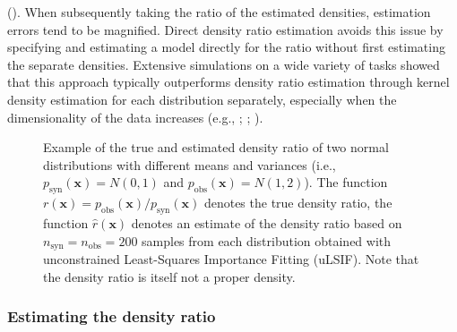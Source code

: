 \documentclass[
]{article}
\newcommand{\pobs}{p_{\text{obs}}}
\newcommand{\psyn}{p_{\text{syn}}}
\newcommand{\nobs}{n_{\text{obs}}}
\newcommand{\nsyn}{n_{\text{syn}}}
\newcommand{\bx}{\mathbf{x}}
\begin{document}
(). When subsequently taking the ratio of the estimated
densities, estimation errors tend to be magnified. Direct density ratio
estimation avoids this issue by specifying and estimating a model
directly for the ratio without first estimating the separate densities.
Extensive simulations on a wide variety of tasks showed that this
approach typically outperforms density ratio estimation through kernel
density estimation for each distribution separately, especially when the
dimensionality of the data increases (e.g.,
;
;
).

\linespread{1}

\begin{figure}[t]


\caption{\label{fig-dr-plot}Example of the true and estimated density
ratio of two normal distributions with different means and variances
(i.e., \(\psyn(\bx) = N(0,1)\) and \(\pobs(\bx) = N(1,2)\)). The
function \(r(\bx) = \pobs(\bx)/\psyn(\bx)\) denotes the true density
ratio, the function \(\hat{r}(\bx)\) denotes an estimate of the density
ratio based on \(\nsyn = \nobs = 200\) samples from each distribution
obtained with unconstrained Least-Squares Importance Fitting (uLSIF).
Note that the density ratio is itself not a proper density.}

\end{figure}%

\linespread{2}

\subsubsection{Estimating the density
ratio}\label{estimating-the-density-ratio}
\end{document}
